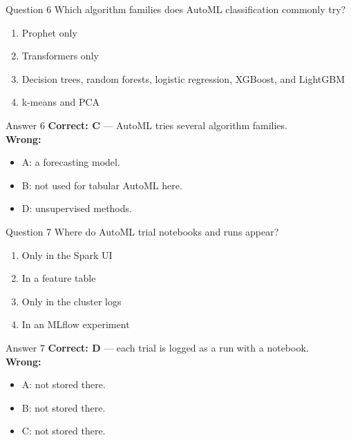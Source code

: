 \documentclass[aspectratio=169,11pt]{beamer}
\begin{document}
\begin{frame}{Question 6}
Which algorithm families does AutoML classification commonly try?
\begin{enumerate}[label=\Alph*.]
\item Prophet only
\item Transformers only
\item Decision trees, random forests, logistic regression, XGBoost, and LightGBM
\item k-means and PCA
\end{enumerate}
\end{frame}
\begin{frame}{Answer 6}
\textbf{Correct: C} --- AutoML tries several algorithm families.\\
\vspace{0.5em}
\textbf{Wrong:}
\begin{itemize}
\item A: a forecasting model.
\item B: not used for tabular AutoML here.
\item D: unsupervised methods.
\end{itemize}
\end{frame}

\begin{frame}{Question 7}
Where do AutoML trial notebooks and runs appear?
\begin{enumerate}[label=\Alph*.]
\item Only in the Spark UI
\item In a feature table
\item Only in the cluster logs
\item In an MLflow experiment
\end{enumerate}
\end{frame}
\begin{frame}{Answer 7}
\textbf{Correct: D} --- each trial is logged as a run with a notebook.\\
\vspace{0.5em}
\textbf{Wrong:}
\begin{itemize}
\item A: not stored there.
\item B: not stored there.
\item C: not stored there.
\end{itemize}
\end{frame}
\end{document}
